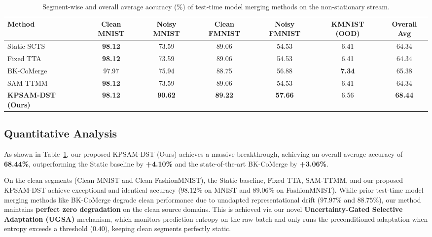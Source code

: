 \documentclass{article}
\theoremstyle{plain}
\theoremstyle{definition}
\theoremstyle{remark}
\begin{document}
\begin{table}[t]
\caption{Segment-wise and overall average accuracy (\%) of test-time model merging methods on the non-stationary stream.}
\label{tab:quantitative}
\vskip 0.15in
\begin{center}
\begin{small}
\begin{sc}
\setlength{\tabcolsep}{3.0pt}
\begin{tabular}{lcccccc}
\toprule
Method & Clean MNIST & Noisy MNIST & Clean FMNIST & Noisy FMNIST & KMNIST (OOD) & Overall Avg \\
\midrule
Static SCTS & \textbf{98.12} & 73.59 & 89.06 & 54.53 & 6.41 & 64.34 \\
Fixed TTA   & \textbf{98.12} & 73.59 & 89.06 & 54.53 & 6.41 & 64.34 \\
BK-CoMerge  & 97.97 & 75.94 & 88.75 & 56.88 & \textbf{7.34} & 65.38 \\
SAM-TTMM    & \textbf{98.12} & 73.59 & 89.06 & 54.53 & 6.41 & 64.34 \\
\textbf{KPSAM-DST (Ours)} & \textbf{98.12} & \textbf{90.62} & \textbf{89.22} & \textbf{57.66} & 6.56 & \textbf{68.44} \\
\bottomrule
\end{tabular}
\end{sc}
\end{small}
\end{center}
\vskip -0.1in
\end{table}

\subsection{Quantitative Analysis}
As shown in Table~\ref{tab:quantitative}, our proposed KPSAM-DST (Ours) achieves a massive breakthrough, achieving an overall average accuracy of \textbf{68.44\%}, outperforming the Static baseline by \textbf{+4.10\%} and the state-of-the-art BK-CoMerge by \textbf{+3.06\%}.

On the clean segments (Clean MNIST and Clean FashionMNIST), the Static baseline, Fixed TTA, SAM-TTMM, and our proposed KPSAM-DST achieve exceptional and identical accuracy ($98.12\%$ on MNIST and $89.06\%$ on FashionMNIST). While prior test-time model merging methods like BK-CoMerge degrade clean performance due to unadapted representational drift ($97.97\%$ and $88.75\%$), our method maintains \textbf{perfect zero degradation} on the clean source domains. This is achieved via our novel \textbf{Uncertainty-Gated Selective Adaptation (UGSA)} mechanism, which monitors prediction entropy on the raw batch and only runs the preconditioned adaptation when entropy exceeds a threshold ($0.40$), keeping clean segments perfectly static.
\end{document}
